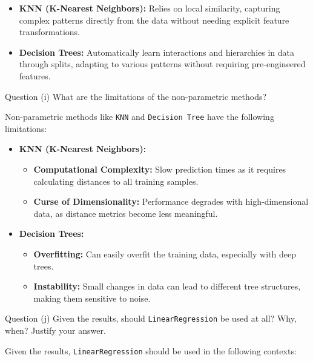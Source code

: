 \begin{itemize}
    \item \textbf{KNN (K-Nearest Neighbors):} Relies on local similarity, capturing complex patterns directly from the data without needing explicit feature transformations.
    \item \textbf{Decision Trees:} Automatically learn interactions and hierarchies in data through splits, adapting to various patterns without requiring pre-engineered features.
\end{itemize}

\clearpage

\begin{customboxnew}[label={box:Q3i}]{Question (i)}
	What are the limitations of the non-parametric methods?
\end{customboxnew}

Non-parametric methods like \texttt{KNN} and \texttt{Decision Tree} have the following limitations:

\begin{itemize}
    \item \textbf{KNN (K-Nearest Neighbors):}
    \begin{itemize}
        \item \textbf{Computational Complexity:} Slow prediction times as it requires calculating distances to all training samples.
        \item \textbf{Curse of Dimensionality:} Performance degrades with high-dimensional data, as distance metrics become less meaningful.
    \end{itemize}
    
    \item \textbf{Decision Trees:}
    \begin{itemize}
        \item \textbf{Overfitting:} Can easily overfit the training data, especially with deep trees.
        \item \textbf{Instability:} Small changes in data can lead to different tree structures, making them sensitive to noise.
    \end{itemize}
\end{itemize}

\begin{customboxnew}[label={box:Q3j}]{Question (j)}
	Given the results, should \verb|LinearRegression| be used at all? Why, when? Justify your answer.
\end{customboxnew}

Given the results, \verb|LinearRegression| should be used in the following contexts:

